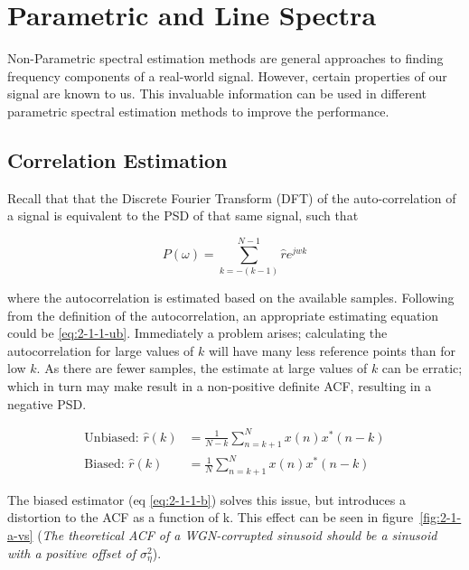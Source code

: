 \documentclass[main.tex]{subfiles}
\begin{document}
\section{Parametric and Line Spectra}

Non-Parametric spectral estimation methods are general approaches to finding frequency components of a real-world signal. However, certain properties of our signal are known to us. This invaluable information can be used in different parametric spectral estimation methods to improve the performance.


\subsection{Correlation Estimation}

Recall that that the Discrete Fourier Transform (DFT) of the auto-correlation of a signal is equivalent to the PSD of that same signal, such that

\begin{equation}
P(\omega) = \sum_{k=-(k-1)}^{N-1}\hat{r}e^{jwk}
\end{equation}

where the autocorrelation is estimated based on the available samples. Following from the definition of the autocorrelation, an appropriate estimating equation could be \ref{eq:2-1-1-ub}. Immediately a problem arises; calculating the autocorrelation for large values of $k$ will have many less reference points than for low $k$.  As there are fewer samples, the estimate at large values of $k$ can be  erratic; which in turn may make result in a non-positive definite ACF, resulting in a negative PSD.


\begin{align}
\text{Unbiased: } \hat{r}(k) &= \frac{1}{N-k}\sum_{n=k+1}^{N}x(n)x^*(n-k) \label{eq:2-1-1-ub}\\
\text{Biased: } \hat{r}(k) &= \frac{1}{N}\sum_{n=k+1}^{N}x(n)x^*(n-k) \label{eq:2-1-1-b}
\end{align}


The biased estimator (eq \ref{eq:2-1-1-b}) solves this issue, but introduces a distortion to the ACF as a function of k. This effect can be seen in figure~\ref{fig:2-1-a-vs} (\textit{The theoretical ACF of a WGN-corrupted sinusoid should be a sinusoid with a positive offset of $\sigma_{\eta}^2$}).
\end{document}
